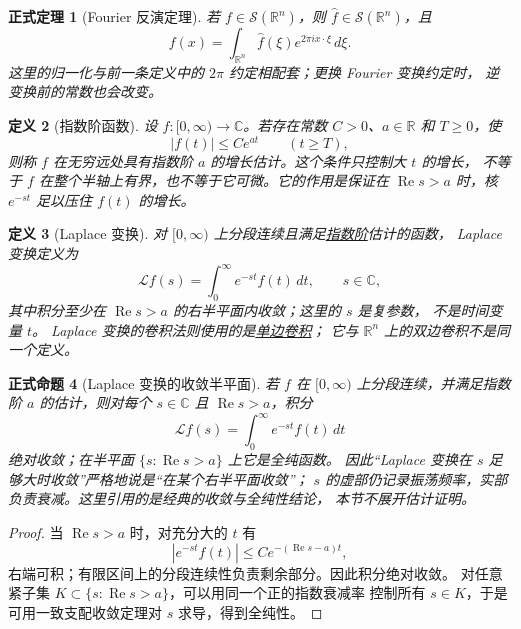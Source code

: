 \documentclass[UTF8,fontset=none,a4paper,11pt]{ctexart}
\theoremstyle{foundation-definition}
\newtheorem{definition}{定义}[section]
\theoremstyle{foundation-theorem}
\newtheorem{theorem}[definition]{正式定理}
\theoremstyle{foundation-proposition}
\newtheorem{proposition}[definition]{正式命题}
\theoremstyle{foundation-example}
\theoremstyle{foundation-remark}
\theoremstyle{foundation-theorem}
\newcommand{\term}[2]{\hyperref[#1]{#2}}
\begin{document}
\begin{theorem}[Fourier 反演定理]\label{thm:fourier-inversion}
若 \(f\in\mathcal S(\mathbb R^n)\)，则 \(\widehat f\in\mathcal S(\mathbb R^n)\)，且
\[
f(x)=\int_{\mathbb R^n}\widehat f(\xi)e^{2\pi i x\cdot\xi}\,d\xi.
\]
这里的归一化与前一条定义中的 \(2\pi\) 约定相配套；更换 Fourier 变换约定时，
逆变换前的常数也会改变。
\end{theorem}

\begin{definition}[指数阶函数]\label{def:exponential-order}
设 \(f:[0,\infty)\to\mathbb C\)。若存在常数 \(C>0\)、\(a\in\mathbb R\) 和 \(T\geq0\)，使
\[
|f(t)|\leq C e^{at}\qquad(t\geq T),
\]
则称 \(f\) 在无穷远处具有指数阶 \(a\) 的增长估计。这个条件只控制大 \(t\) 的增长，
不等于 \(f\) 在整个半轴上有界，也不等于它可微。它的作用是保证在
\(\operatorname{Re}s>a\) 时，核 \(e^{-st}\) 足以压住 \(f(t)\) 的增长。
\end{definition}

\begin{definition}[Laplace 变换]\label{def:laplace-transform}
对 \([0,\infty)\) 上分段连续且满足\term{def:exponential-order}{指数阶}估计的函数，
Laplace 变换定义为
\[
\mathcal Lf(s)=\int_0^\infty e^{-st}f(t)\,dt,
\qquad s\in\mathbb C,
\]
其中积分至少在 \(\operatorname{Re}s>a\) 的右半平面内收敛；这里的 \(s\) 是复参数，
不是时间变量 \(t\)。
Laplace 变换的卷积法则使用的是\term{def:one-sided-convolution}{单边卷积}；
它与 \(\mathbb R^n\) 上的双边卷积不是同一个定义。
\end{definition}

\begin{proposition}[Laplace 变换的收敛半平面]\label{prop:laplace-half-plane}
若 \(f\) 在 \([0,\infty)\) 上分段连续，并满足指数阶 \(a\) 的估计，则对每个
\(s\in\mathbb C\) 且 \(\operatorname{Re}s>a\)，积分
\[
\mathcal Lf(s)=\int_0^\infty e^{-st}f(t)\,dt
\]
绝对收敛；在半平面 \(\{s:\operatorname{Re}s>a\}\) 上它是全纯函数。
因此“Laplace 变换在 \(s\) 足够大时收敛”严格地说是“在某个右半平面收敛”；
\(s\) 的虚部仍记录振荡频率，实部负责衰减。这里引用的是经典的收敛与全纯性结论，
本节不展开估计证明。
\end{proposition}

\begin{proof}
当 \(\operatorname{Re}s>a\) 时，对充分大的 \(t\) 有
\[
|e^{-st}f(t)|\leq C e^{-(\operatorname{Re}s-a)t},
\]
右端可积；有限区间上的分段连续性负责剩余部分。因此积分绝对收敛。
对任意紧子集 \(K\subset\{s:\operatorname{Re}s>a\}\)，可以用同一个正的指数衰减率
控制所有 \(s\in K\)，于是可用一致支配收敛定理对 \(s\) 求导，得到全纯性。
\end{proof}
\end{document}
